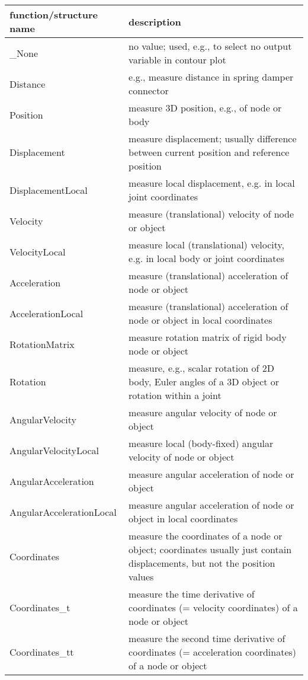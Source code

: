 \begin{center}
\footnotesize
\begin{longtable}{| p{8cm} | p{8cm} |} 
\hline
{\bf function/structure name} & {\bf description}\\ \hline
  \_None & no value; used, e.g., to select no output variable in contour plot\\ \hline  
  Distance & e.g., measure distance in spring damper connector\\ \hline  
  Position & measure 3D position, e.g., of node or body\\ \hline  
  Displacement & measure displacement; usually difference between current position and reference position\\ \hline  
  DisplacementLocal & measure local displacement, e.g. in local joint coordinates\\ \hline  
  Velocity & measure (translational) velocity of node or object\\ \hline  
  VelocityLocal & measure local (translational) velocity, e.g. in local body or joint coordinates\\ \hline  
  Acceleration & measure (translational) acceleration of node or object\\ \hline  
  AccelerationLocal & measure (translational) acceleration of node or object in local coordinates\\ \hline  
  RotationMatrix & measure rotation matrix of rigid body node or object\\ \hline  
  Rotation & measure, e.g., scalar rotation of 2D body, Euler angles of a 3D object or rotation within a joint\\ \hline  
  AngularVelocity & measure angular velocity of node or object\\ \hline  
  AngularVelocityLocal & measure local (body-fixed) angular velocity of node or object\\ \hline  
  AngularAcceleration & measure angular acceleration of node or object\\ \hline  
  AngularAccelerationLocal & measure angular acceleration of node or object in local coordinates\\ \hline  
  Coordinates & measure the coordinates of a node or object; coordinates usually just contain displacements, but not the position values\\ \hline  
  Coordinates\_t & measure the time derivative of coordinates (= velocity coordinates) of a node or object\\ \hline  
  Coordinates\_tt & measure the second time derivative of coordinates (= acceleration coordinates) of a node or object\\ \hline  

\end{longtable}
\end{center}
